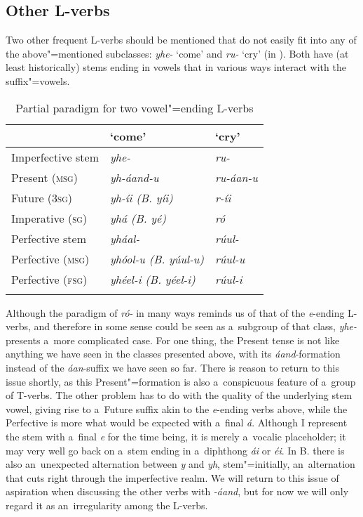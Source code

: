 \subsection{Other L-verbs}
\label{subsec:8-3-4}


Two other frequent L-verbs should be mentioned that do not easily fit into any of the above"=mentioned subclasses: \textit{yhe-} `come' and \textit{ru-} `cry' (in ). Both have (at least historically) stems ending in vowels that in various ways interact with the suffix"=vowels. 


\begin{table}[ht]
\caption{Partial paradigm for two vowel"=ending L-verbs}
\begin{tabularx}{\textwidth}{ Q Q Q }
\lsptoprule
&
`come' &
`cry'\\\hline
Imperfective stem &
\textit{yhe-} &
\textit{ru-} \\
Present (\textsc{msg}) &
\textit{yh-áand-u} &
\textit{ru-áan-u} \\
Future (\textsc{3sg}) &
\textit{yh-íi (B. yíi)} &
\textit{r-íi} \\
Imperative (\textsc{sg}) &
\textit{yhá (B. yé)} &
\textit{ró} \\
Perfective stem &
\textit{yháal-} &
\textit{rúul-} \\
Perfective (\textsc{msg}) &
\textit{yhóol-u (B. yúul-u)} &
\textit{rúul-u} \\
Perfective (\textsc{fsg}) &
\textit{yhéel-i (B. yéel-i)} &
\textit{rúul-i} \\\lspbottomrule
\end{tabularx}
\label{tab:8-7}
\end{table}


Although the paradigm of \textit{ró- }in many ways reminds us of that of the \textit{e}-ending L-verbs, and therefore in some sense could be seen as a~subgroup of that class, \textit{yhe-} presents a~more complicated case. For one thing, the Present tense is not like anything we have seen in the classes presented above, with its \textit{áand}-formation instead of the \textit{áan}-suffix we have seen so far. There is reason to return to this issue shortly, as this Present"=formation is also a~conspicuous feature of a~group of T-verbs. The other problem has to do with the quality of the underlying stem vowel, giving rise to a~Future suffix akin to the \textit{e}-ending verbs above, while the Perfective is more what would be expected with a~final \textit{á}. Although I represent the stem with a~final \textit{e} for the time being, it is merely a~vocalic placeholder; it may very well go back on a~stem ending in a~diphthong \textit{ái} or \textit{éi}. In B. there is also an~unexpected alternation between \textit{y} and \textit{yh}, stem"=initially, an~alternation that cuts right through the imperfective realm. We will return to this issue of aspiration when discussing the other verbs with \textit{-áand}, but for now we will only regard it as an~irregularity among the L-verbs.


